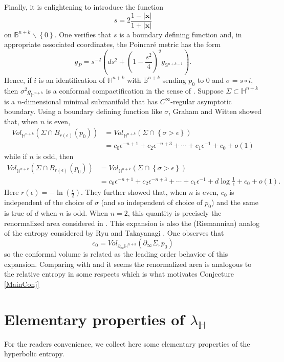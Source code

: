 \documentclass{amsart}
\theoremstyle{definition}
\theoremstyle{remark}
\numberwithin{equation}{section}
\newcommand{\set}[1]{\left\{#1\right\}}
\begin{document}
Finally, it is enlightening to introduce the function 
$$
s=2\frac{1-|\mathbf{x}|}{1+|\mathbf{x}|}
$$
on $\mathbb{B}^{n+k} \backslash\set{0}$. One verifies that $s$ is a boundary defining function and,
in appropriate associated  coordinates,  the Poincar\'{e} metric has the form
$$
g_P= s^{-2} \left( ds^2+ \left(1-\frac{s^2}{4}\right)^{2} g_{\mathbb{S}^{n+k-1}}\right).
$$
Hence, if $i$ is an identification of $\mathbb{H}^{n+k}$ with $\mathbb{B}^{n+k}$ sending $p_0$ to $0$ and $\sigma=s\circ i$, then $\sigma^2 g_{\mathbb{H}^{n+k}}$ is a conformal compactification in the sense of \cite{grahamConformalAnomalySubmanifold1999}.
Suppose $\Sigma\subset \mathbb{H}^{n+k}$ is a $n$-dimensional minimal submanifold that has $C^\infty$-regular asymptotic boundary. Using a boundary defining function like $\sigma$,  Graham and Witten \cite{grahamConformalAnomalySubmanifold1999} showed that, when $n$ is even,
\begin{align*}
Vol_{\mathbb{H}^{n+k}}(\Sigma\cap B_{r(\epsilon)}(p_0))&=Vol_{\mathbb{H}^{n+k}}(\Sigma\cap \set{\sigma>\epsilon})\\
&=c_0 \epsilon^{-n+1}+c_2 \epsilon^{-n+3}+\cdots+c_1 \epsilon^{-1} +c_0 +o(1)
\end{align*}
while if $n$ is odd, then
\begin{align*}
Vol_{\mathbb{H}^{n+k}}(\Sigma\cap B_{r(\epsilon)}(p_0))&=
Vol_{\mathbb{H}^{n+k}}(\Sigma\cap \set{\sigma>\epsilon})\\
&= c_0 \epsilon^{-n+1}+c_2 \epsilon^{-n+3}+\cdots+c_1 \epsilon^{-1} +d \log \frac{1}{\epsilon} +c_0 +o(1).
\end{align*}
Here $r(\epsilon)=-\ln\left(\frac{\epsilon}{2}\right)$.
They further showed that, when $n$ is even, $c_0$ is independent of the choice of $\sigma$ (and so independent of choice of $p_0$)  and the same is true of $d$ when $n$ is odd. When $n=2$, this quantity is precisely the renormalized area considered in \cite{Alexakis2010}. This expansion is also the (Riemannian) analog of the entropy considered by Ryu and Takayanagi \cite{Ryu2006, Ryu2006a}. One observes that
$$
c_0=Vol_{\partial_{\infty}\mathbb{H}^{n+k}}(\partial_\infty \Sigma,p_0)
$$
so the conformal volume is related as the leading order behavior of this expansion.  Comparing with \cite{BWRelEnt} and \cite{BWTopUniq} it seems the renormalized area is analogous to the relative entropy in some respects which is what motivates Conjecture \ref{MainConj}

\appendix
\section{Elementary properties of $\lambda_{\mathbb{H}}$}
For the readers convenience, we collect here some elementary properties of the hyperbolic entropy.
\end{document}
